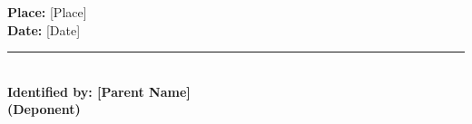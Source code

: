 \documentclass[12pt, a4paper]{article}
\begin{document}
\vspace{1cm}
\noindent \textbf{Place:} [Place] \\
\textbf{Date:} [Date]

\vspace{1.5cm}
\begin{flushleft}
    \rule{6cm}{0.4pt} \\
    \textbf{Identified by: [Parent Name]} \\
    \textbf{(Deponent)}
\end{flushleft}
\end{document}
